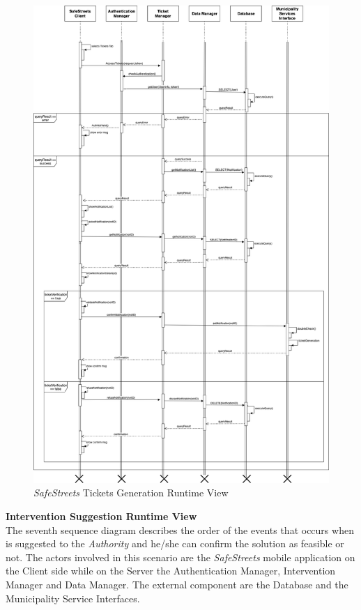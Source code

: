 \documentclass{article}
\begin{document}
	\begin{figure}[H]
			\centering
			\includegraphics[scale=0.20]{Images/Diagrams/Runtime/tickets_runtime.png}
			\caption{{\it SafeStreets} Tickets Generation Runtime View}
	\end{figure}
	\pagebreak
	\noindent	
	{\bf Intervention Suggestion Runtime View} \\
	The seventh sequence diagram describes the order of the events that occurs when is suggested to the {\it Authority} and he/she can confirm the solution as feasible or not. The actors involved in this scenario are the {\it SafeStreets} mobile application on the Client side while on the Server the Authentication Manager, Intervention Manager and Data Manager. The external component are the Database and the Municipality Service Interfaces. \\
\end{document}
